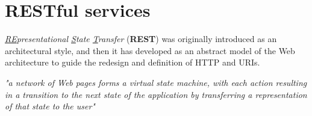 \newpage
\section{RESTful services}
\begin{paracol}{2}
   \textit{\underline{RE}presentational \underline{S}tate \underline{T}ransfer} (\textbf{REST}) was originally introduced as an architectural
   style, 
   and then it has developed as an abstract model of the
   Web architecture to guide the redesign and
   definition of HTTP and URIs.
   
   \switchcolumn

   \begin{center}
      \textit{
      "a network of Web pages forms a virtual state machine,
      with each action resulting in a transition
      to the next state of the application by
      transferring a representation of that
      state to the user"}
   \end{center}

\end{paracol}

